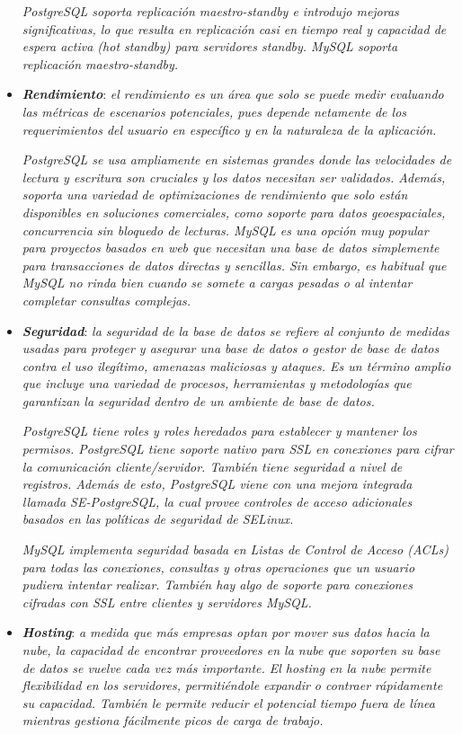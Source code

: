 \documentclass[11pt,oneside]{book}
\begin{document}
\begin{itemize}
\textit{PostgreSQL soporta replicación maestro-standby e introdujo mejoras significativas, lo que resulta en replicación casi en tiempo real y capacidad de espera activa (hot standby) para servidores standby. MySQL soporta replicación maestro-standby.}

\item \textit{\textbf{Rendimiento}}: \textit{el rendimiento es un área que solo se puede medir evaluando las métricas de escenarios potenciales, pues depende netamente de los requerimientos del usuario en específico y en la naturaleza de la aplicación.}

\textit{PostgreSQL se usa ampliamente en sistemas grandes donde las velocidades de lectura y escritura son cruciales y los datos necesitan ser validados. Además, soporta una variedad de optimizaciones de rendimiento que solo están disponibles en soluciones comerciales, como soporte para datos geoespaciales, concurrencia sin bloquedo de lecturas. MySQL es una opción muy popular para proyectos basados en web que necesitan una base de datos simplemente para transacciones de datos directas y sencillas. Sin embargo, es habitual que MySQL no rinda bien cuando se somete a cargas pesadas o al intentar completar consultas complejas.}

\item \textit{\textbf{Seguridad}}: \textit{la seguridad de la base de datos se refiere al conjunto de medidas usadas para proteger y asegurar una base de datos o gestor de base de datos contra el uso ilegítimo, amenazas maliciosas y ataques. Es un término amplio que incluye una variedad de procesos, herramientas y metodologías que garantizan la seguridad dentro de un ambiente de base de datos.}

\textit{PostgreSQL tiene roles y roles heredados para establecer y mantener los permisos. PostgreSQL tiene soporte nativo para SSL en conexiones para cifrar la comunicación cliente/servidor. También tiene seguridad a nivel de registros. Además de esto, PostgreSQL viene con una mejora integrada llamada SE-PostgreSQL, la cual provee controles de acceso adicionales basados en las políticas de seguridad de SELinux.}

\textit{MySQL implementa seguridad basada en Listas de Control de Acceso (ACLs) para todas las conexiones, consultas y otras operaciones que un usuario pudiera intentar realizar. También hay algo de soporte para conexiones cifradas con SSL entre clientes y servidores MySQL.}

\item \textit{\textbf{Hosting}}: \textit{a medida que más empresas optan por mover sus datos hacia la nube, la capacidad de encontrar proveedores en la nube que soporten su base de datos se vuelve cada vez más importante. El hosting en la nube permite flexibilidad en los servidores, permitiéndole expandir o contraer rápidamente su capacidad. También le permite reducir el potencial tiempo fuera de línea mientras gestiona fácilmente picos de carga de trabajo.}


\end{itemize}
\end{document}
